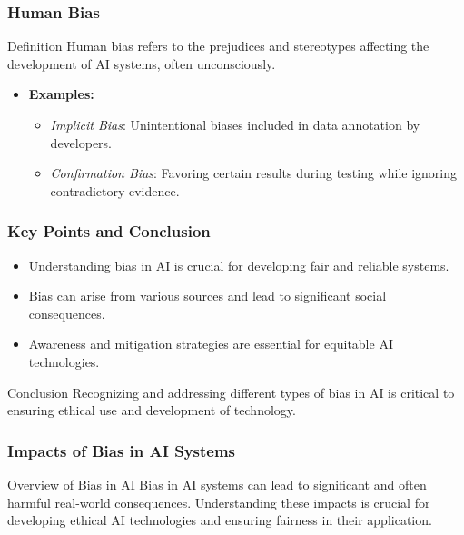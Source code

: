 \documentclass{beamer}
\begin{document}
\begin{frame}[fragile]
    \frametitle{Human Bias}
    \begin{block}{Definition}
        Human bias refers to the prejudices and stereotypes affecting the development of AI systems, often unconsciously.
    \end{block}
    \begin{itemize}
        \item \textbf{Examples:}
        \begin{itemize}
            \item \textit{Implicit Bias}: Unintentional biases included in data annotation by developers.
            \item \textit{Confirmation Bias}: Favoring certain results during testing while ignoring contradictory evidence.
        \end{itemize}
    \end{itemize}
\end{frame}

\begin{frame}[fragile]
    \frametitle{Key Points and Conclusion}
    \begin{itemize}
        \item Understanding bias in AI is crucial for developing fair and reliable systems.
        \item Bias can arise from various sources and lead to significant social consequences.
        \item Awareness and mitigation strategies are essential for equitable AI technologies.
    \end{itemize}
    \begin{block}{Conclusion}
        Recognizing and addressing different types of bias in AI is critical to ensuring ethical use and development of technology.
    \end{block}
\end{frame}

\begin{frame}[fragile]
    \frametitle{Impacts of Bias in AI Systems}
    \begin{block}{Overview of Bias in AI}
        Bias in AI systems can lead to significant and often harmful real-world consequences. Understanding these impacts is crucial for developing ethical AI technologies and ensuring fairness in their application.
    \end{block}
\end{frame}
\end{document}
